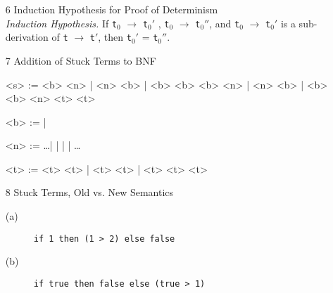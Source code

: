 \documentclass{article}
\begin{document}
\begin{description}
\begin{enumerate}
\begin{proof}
\begin{enumerate}
        \item E-IfFalse: A similar argument holds.

        \item E-If: \verb|t|$_1$ must take a step to some \verb|t|$_1'$, and \verb|t| has the form
        \verb|if t|$_1$ \verb|then t|$_2$ \verb|else t|$_3$.
        The last rule in derivation of \verb|t| $\longrightarrow$ \verb|t|$''$ can be 3 cases:
          \begin{enumerate}
            \item E-IfTrue: \verb|t|$_1$ is \verb|true|, and values can't take a step.
            \item E-IfFalse: A similar argument holds.
            \item E-If: then \verb|t|$_1$ must take a step to some \verb|t|$_1''$. By the inductive hypothesis, since we know \verb|t|$_1$ steps to both \verb|t|$_1'$ and \verb|t|$_1''$,
            then \verb|t|$_1'$ and \verb|t|$_1''$ must be the same.
            \end{enumerate}
      \end{enumerate}
    \end{proof}

  \item[6]{Induction Hypothesis for Proof of Determinism}
    \vspace{0.3cm}\\
    \textit{Induction Hypothesis.} If \verb|t|$_0$ $\longrightarrow$ \verb|t|$_0'$ , \verb|t|$_0$ $\longrightarrow$ \verb|t|$_0''$, and \verb|t|$_0$ $\longrightarrow$ \verb|t|$_0'$ is a sub-derivation of \verb|t| $\longrightarrow$ \verb|t|$'$, then \verb|t|$_0'$ = \verb|t|$_0''$.

  \item[7]{Addition of Stuck Terms to BNF}

    \begin{grammar}
      <s> :=  <b>  \lit*{+} <n> | <n> \lit*{+} <b> | <b> \lit*{+} <b>
      \alt <b>  \lit*{>} <n> | <n> \lit*{>} <b> | <b> \lit*{>} <b>
      \alt {} <n>  <t>  <t>

      <b> :=  | 

      <n> := \ldots |  |  |  | \ldots

      <t> := <t> \lit*{+} <t> | <t> \lit*{>} <t> |  <t>  <t>  <t>
    \end{grammar}

  \item[8]{Stuck Terms, Old vs. New Semantics}
    \begin{description}
      \item[(a)] \verb|if 1 then (1 > 2) else false|
      \item[(b)] \verb|if true then false else (true > 1)|
    \end{description}


\end{enumerate}
\end{description}
\end{document}
